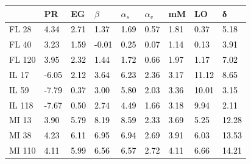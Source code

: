 \begin{tabular}{lllllllll}
\toprule
 & PR & EG & $β$ & $α_s$ & $α_v$ & mM & LO & δ \\
\midrule
FL 28 & \textcolor{black}{ 4.34 } & \textcolor{black}{ 2.71 } & \textcolor{black}{ 1.37 } & \textcolor{black}{ 1.69 } & \textcolor{black}{ 0.57 } & \textcolor{black}{ 1.81 } & \textcolor{black}{ 0.37 } & \textcolor{black}{ 5.18 } \\
FL 40 & \textcolor{black}{ 3.23 } & \textcolor{black}{ 1.59 } & \textcolor{black}{ -0.01 } & \textcolor{black}{ 0.25 } & \textcolor{black}{ 0.07 } & \textcolor{black}{ 1.14 } & \textcolor{black}{ 0.13 } & \textcolor{black}{ 3.91 } \\
FL 120 & \textcolor{black}{ 3.95 } & \textcolor{black}{ 2.32 } & \textcolor{black}{ 1.44 } & \textcolor{black}{ 1.72 } & \textcolor{black}{ 0.66 } & \textcolor{black}{ 1.97 } & \textcolor{black}{ 1.17 } & \textcolor{black}{ 7.02 } \\
IL 17 & \textcolor{black}{ -6.05 } & \textcolor{black}{ 2.12 } & \textcolor{black}{ 3.64 } & \textcolor{black}{ 6.23 } & \textcolor{black}{ 2.36 } & \textcolor{black}{ 3.17 } & \textcolor{black}{ 11.12 } & \textcolor{black}{ 8.65 } \\
IL 59 & \textcolor{black}{ -7.79 } & \textcolor{black}{ 0.37 } & \textcolor{black}{ 3.00 } & \textcolor{black}{ 5.80 } & \textcolor{black}{ 2.03 } & \textcolor{black}{ 3.36 } & \textcolor{black}{ 10.01 } & \textcolor{black}{ 3.15 } \\
IL 118 & \textcolor{black}{ -7.67 } & \textcolor{black}{ 0.50 } & \textcolor{black}{ 2.74 } & \textcolor{black}{ 4.49 } & \textcolor{black}{ 1.66 } & \textcolor{black}{ 3.18 } & \textcolor{black}{ 9.94 } & \textcolor{black}{ 2.11 } \\
MI 13 & \textcolor{black}{ 3.90 } & \textcolor{black}{ 5.79 } & \textcolor{black}{ 8.19 } & \textcolor{black}{ 8.59 } & \textcolor{black}{ 2.33 } & \textcolor{black}{ 3.69 } & \textcolor{black}{ 5.25 } & \textcolor{black}{ 12.28 } \\
MI 38 & \textcolor{black}{ 4.23 } & \textcolor{black}{ 6.11 } & \textcolor{black}{ 6.95 } & \textcolor{black}{ 6.94 } & \textcolor{black}{ 2.69 } & \textcolor{black}{ 3.91 } & \textcolor{black}{ 6.03 } & \textcolor{black}{ 13.53 } \\
MI 110 & \textcolor{black}{ 4.11 } & \textcolor{black}{ 5.99 } & \textcolor{black}{ 6.56 } & \textcolor{black}{ 6.57 } & \textcolor{black}{ 2.72 } & \textcolor{black}{ 4.11 } & \textcolor{black}{ 6.66 } & \textcolor{black}{ 14.21 } \\

\end{tabular}

